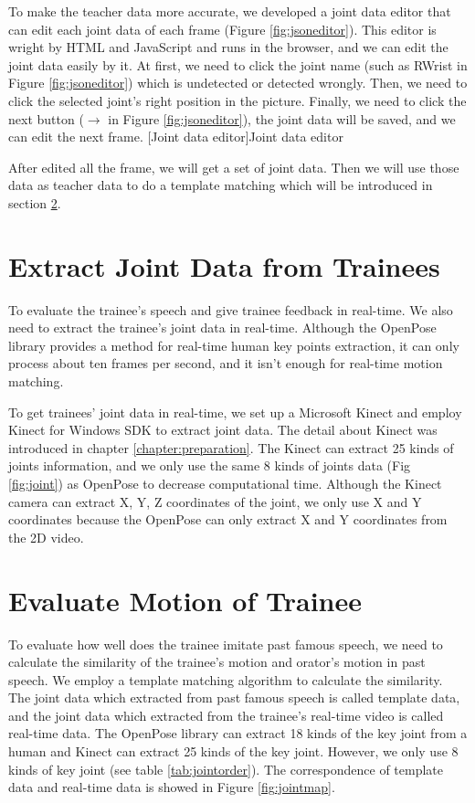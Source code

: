 \par To make the teacher data more accurate, we developed a joint data editor that can edit each joint data of each frame (Figure \ref{fig:jsoneditor}). This editor is wright by HTML and JavaScript and runs in the browser, and we can edit the joint data easily by it. At first, we need to click the joint name (such as RWrist in Figure \ref{fig:jsoneditor}) which is undetected or detected wrongly. Then, we need to click the selected joint's right position in the picture. Finally, we need to click the next button ($\longrightarrow$ in Figure \ref{fig:jsoneditor}), the joint data will be saved, and we can edit the next frame. 
[Joint data editor]{Joint data editor}

\par After edited all the frame, we will get a set of joint data. Then we will use those data as teacher data to do a template matching which will be introduced in section \ref{sec:template}.


\section{Extract Joint Data from Trainees}
\par To evaluate the trainee's speech and give trainee feedback in real-time. We also need to extract the trainee's joint data in real-time. Although the OpenPose library provides a method for real-time human key points extraction, it can only process about ten frames per second, and it isn't enough for real-time motion matching. 
\par To get trainees' joint data in real-time, we set up a Microsoft Kinect and employ Kinect for Windows SDK to extract joint data. The detail about Kinect was introduced in chapter \ref{chapter:preparation}. The Kinect can extract 25 kinds of joints information, and we only use the same 8 kinds of joints data (Fig \ref{fig:joint}) as OpenPose to decrease computational time. Although the Kinect camera can extract X, Y, Z coordinates of the joint, we only use X and Y coordinates because the OpenPose can only extract X and Y coordinates from the 2D video. 

\section{Evaluate Motion of Trainee}
\label{sec:template}
\par To evaluate how well does the trainee imitate past famous speech, we need to calculate the similarity of the trainee's motion and orator's motion in past speech. We employ a template matching algorithm to calculate the similarity. The joint data which extracted from past famous speech is called template data, and the joint data which extracted from the trainee's real-time video is called real-time data. The OpenPose library can extract 18 kinds of the key joint from a human and Kinect can extract 25 kinds of the key joint. However, we only use 8 kinds of key joint (see table \ref{tab:jointorder}). The correspondence of template data and real-time data is showed in Figure \ref{fig:jointmap}.

